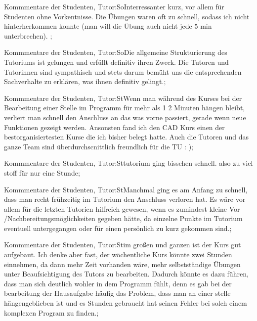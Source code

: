 \documentclass[10pt]{beamer}
\begin{document}
\begin{frame}[fragile]{Kommmentare der Studenten, Tutor:So}Interressanter kurz, vor allem für Studenten ohne Vorkentnisse. Die Übungen waren oft zu schnell, sodass ich nicht hinterherkommen konnte (man will die Übung auch nicht jede 5 min unterbrechen). ;
 \end{frame}
\begin{frame}[fragile]{Kommmentare der Studenten, Tutor:So}Die allgemeine Strukturierung des Tutoriums ist gelungen und erfüllt definitiv ihren Zweck. Die Tutoren und Tutorinnen sind sympathisch und stets darum bemüht uns die entsprechenden Sachverhalte zu erklären, was ihnen definitiv gelingt.;
 \end{frame}
\begin{frame}[fragile]{Kommmentare der Studenten, Tutor:St}Wenn man während des Kurses bei der Bearbeitung einer Stelle im Programm für mehr als 1 2 Minuten hängen bleibt, verliert man schnell den Anschluss an das was vorne passiert, gerade wenn neue Funktionen gezeigt werden. Ansonsten fand ich den CAD Kurs einen der bestorganisiertesten Kurse die ich bisher belegt hatte. Auch die Tutoren und das ganze Team sind überdurchscnittlich freundlich für die TU : );
 \end{frame}
\begin{frame}[fragile]{Kommmentare der Studenten, Tutor:St}tutorium ging bisschen schnell. also zu viel stoff für nur eine Stunde;
 \end{frame}
\begin{frame}[fragile]{Kommmentare der Studenten, Tutor:St}Manchmal ging es am Anfang zu schnell, dass man recht frühzeitig im Tutorium den Anschluss verloren hat.  Es wäre vor allem für die letzten Tutorien hilfreich gewesen, wenn es zumindest kleine Vor /Nachbereitungsmöglichkeiten gegeben hätte, da einzelne Punkte im Tutorium eventuell untergegangen oder für einen persönlich zu kurz gekommen sind.;
 \end{frame}
\begin{frame}[fragile]{Kommmentare der Studenten, Tutor:St}im großen und ganzen ist der Kurs gut aufgebaut. Ich denke aber fast, der wöchentliche Kurs könnte zwei Stunden einnehmen, da dann mehr Zeit vorhanden wäre, mehr selbstständige Übungen unter Beaufsichtigung des Tutors zu bearbeiten. Dadurch könnte es dazu führen, dass man sich deutlich wohler in dem Programm fühlt, denn es gab bei der bearbeitung der Hausaufgabe häufig das Problem, dass man an einer stelle hängengeblieben ist und es Stunden gebraucht hat seinen Fehler bei solch einem komplexen Program zu finden.;
 \end{frame}
\end{document}
